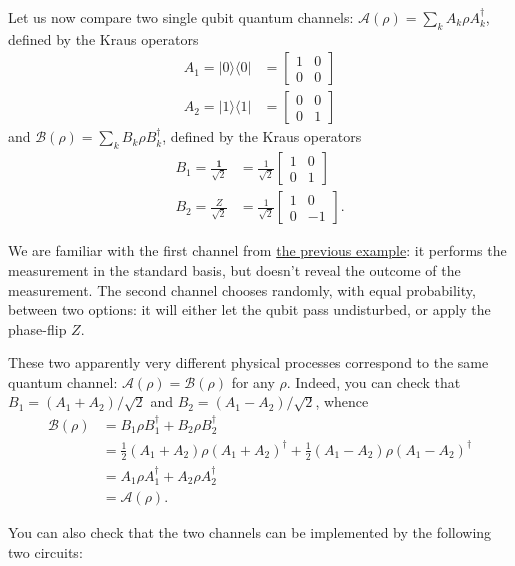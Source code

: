 \documentclass[fleqn]{article}
\begin{document}
Let us now compare two single qubit quantum channels: \(\mathcal{A}(\rho)=\sum_k A_k\rho A^\dagger_k\), defined by the Kraus operators
\[
  \begin{aligned}
    A_1 = |0\rangle\langle 0|
    &= \begin{bmatrix}1&0\\0&0\end{bmatrix}
  \\A_2 = |1\rangle\langle 1|
  &= \begin{bmatrix}0&0\\0&1\end{bmatrix}
  \end{aligned}
\]
and \(\mathcal{B}(\rho)=\sum_k B_k\rho B^\dagger_k\), defined by the Kraus operators
\[
  \begin{aligned}
    B_1 = \frac{\mathbf{1}}{\sqrt{2}}
    &= \frac{1}{\sqrt{2}}\begin{bmatrix}1&0\\0&1\end{bmatrix}
  \\B_2 = \frac{Z}{\sqrt{2}}
    &= \frac{1}{\sqrt{2}}\begin{bmatrix}1&0\\0&-1\end{bmatrix}.
  \end{aligned}
\]

We are familiar with the first channel from \protect\hyperlink{control-controlled-NOT}{the previous example}: it performs the measurement in the standard basis, but doesn't reveal the outcome of the measurement.
The second channel chooses randomly, with equal probability, between two options: it will either let the qubit pass undisturbed, or apply the phase-flip \(Z\).

These two apparently very different physical processes correspond to the same quantum channel: \(\mathcal{A}(\rho)=\mathcal{B}(\rho)\) for any \(\rho\).
Indeed, you can check that \(B_1=(A_1+A_2)/\sqrt{2}\) and \(B_2=(A_1-A_2)/\sqrt{2}\), whence
\[
  \begin{aligned}
    \mathcal{B}(\rho)
    &= B_1\rho B_1^\dagger + B_2\rho B_2^\dagger
  \\&= \frac{1}{2} (A_1+A_2)\rho (A_1+A_2)^\dagger + \frac{1}{2} (A_1-A_2)\rho (A_1-A_2)^\dagger
  \\&=  A_1\rho A_1^\dagger + A_2\rho A_2^\dagger
  \\&= \mathcal{A}(\rho).
  \end{aligned}
\]

You can also check that the two channels can be implemented by the following two circuits:
\end{document}

